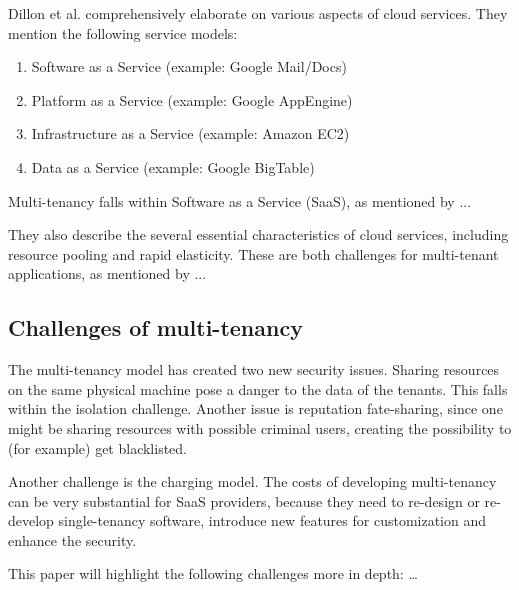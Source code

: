 Dillon et al.\cite{dillon2010cloud} comprehensively elaborate on various aspects of cloud services. They mention the following service models: 

\begin{enumerate}
\item Software as a Service (example: Google Mail/Docs)
\item Platform as a Service (example: Google AppEngine)
\item Infrastructure as a Service (example: Amazon EC2)
\item Data as a Service (example: Google BigTable)
\end{enumerate}

Multi-tenancy falls within Software as a Service (SaaS), as mentioned by ... %

They also describe the several essential characteristics of cloud services, including resource pooling and rapid elasticity. These are both challenges for multi-tenant applications, as mentioned by ... %

\subsection{Challenges of multi-tenancy}

The multi-tenancy model has created two new security issues\cite{dillon2010cloud}. Sharing resources on the same physical machine pose a danger to the data of the tenants. This falls within the isolation challenge. Another issue is reputation fate-sharing, since one might be sharing resources with possible criminal users, creating the possibility to (for example) get blacklisted.

Another challenge is the charging model. The costs of developing multi-tenancy can be very substantial for SaaS providers, because they need to re-design or re-develop single-tenancy software, introduce new features for customization and enhance the security.

This paper will highlight the following challenges more in depth: \ldots %
